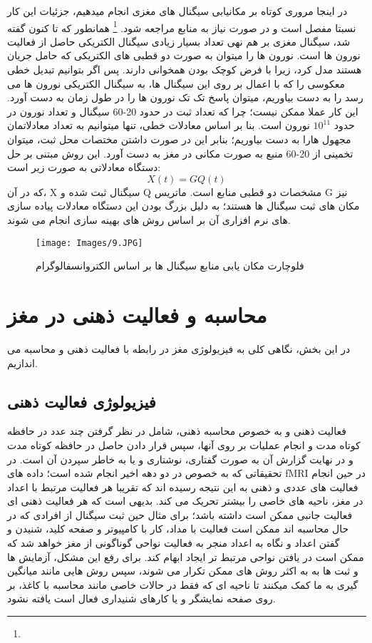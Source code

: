 \documentclass[11pt]{extarticle}
\begin{document}
در اینجا مروری کوتاه بر مکانیابی سیگنال های مغزی انجام میدهیم، جزئیات این کار نسبتا مفصل است و در صورت نیاز به منابع مراجعه شود.
\footnote{}
همانطور که تا کنون گفته شد، سیگنال مغزی بر هم نهی تعداد بسیار زیادی سیگنال الکتریکی حاصل از فعالیت نورون ها است. نورون ها را میتوان به صورت دو قطبی های الکتریکی که حامل جریان هستند مدل کرد، زیرا با فرض کوچک بودن همخوانی دارند. پس اگر بتوانیم تبدیل خطی معکوسی را که با اعمال بر روی این سیگنال ها، به سیگنال الکتریکی نورون ها می رسد را به دست بیاوریم، میتوان پاسخ تک تک نورون ها را در طول زمان به دست آورد. این کار عملا ممکن نیست؛ چرا که تعداد ثبت در حدود 20-60 سیگنال و تعداد نورون در حدود 
$10^11$
نورون است. بنا بر اساس معادلات خطی، تنها میتوانیم به تعداد معادلاتمان مجهول هارا به دست بیاوریم؛ بنابر این در صورت داشتن مختصات محل ثبت، میتوان تخمینی از 20-60 منبع به صورت مکانی در مغز به دست آورد. این روش مبتنی بر حل دستگاه معادلاتی به صورت زیر است:
$$ X(t) = G Q(t) $$
که در آن، X سیگنال ثبت شده و Q مشخصات دو قطبی منابع است. ماتریس G نیز مکان های ثبت سیگنال ها هستند؛ به دلیل بزرگ بودن این دستگاه معادلات پیاده سازی های نرم افزاری آن بر اساس روش های بهینه سازی انجام می شوند.

\begin{figure}[h!]
	\centering
	\texttt{[image: Images/9.JPG]}
	\caption{فلوچارت مکان یابی منابع سیگنال ها بر اساس الکتروانسفالوگرام}
	\label{fig:14}
\end{figure}

\clearpage
\newpage

\section{محاسبه و فعالیت ذهنی در مغز}

در این بخش، نگاهی کلی به فیزیولوژی مغز در رابطه با فعالیت ذهنی و محاسبه می اندازیم. 

\subsection{فیزیولوژی فعالیت ذهنی}

فعالیت ذهنی و به خصوص محاسبه ذهنی، شامل در نظر گرفتن چند عدد در حافظه کوتاه مدت و انجام عملیات بر روی آنها، سپس قرار دادن حاصل در حافظه کوتاه مدت و در نهایت گزارش آن به صورت گفتاری، نوشتاری و یا به خاطر سپردن آن است. در تحقیقاتی که به خصوص در دو دهه اخیر انجام شده است؛ داده های fMRI  در حین انجام فعالیت های عددی و ذهنی به این نتیجه رسیده اند که تقریبا هر فعالیت مرتبط با اعداد در مغز، ناحیه های خاصی را بیشتر تحریک می کند. بدیهی است که هر فعالیت ذهنی ای فعالیت جانبی ممکن است داشته باشد؛ برای مثال حین ثبت سیگنال از افرادی که در حال محاسبه اند ممکن است فعالیت با مداد، کار با کامپیوتر و صفحه کلید، شنیدن و گفتن اعداد و نگاه به اعداد منجر به فعالیت نواحی گوناگونی از مغز خواهد شد که ممکن است در یافتن نواحی مرتبط تر ایجاد ابهام کند. برای رفع این مشکل، آزمایش ها و ثبت ها به به اکثر روش های ممکن تکرار می شوند، سپس روش هایی مانند میانگین گیری به ما کمک میکنند تا ناحیه ای که فقط در حالات خاصی مانند محاسبه با کاغذ، بر روی صفحه نمایشگر و یا کارهای شنیداری فعال است یافته نشود.
\end{document}
